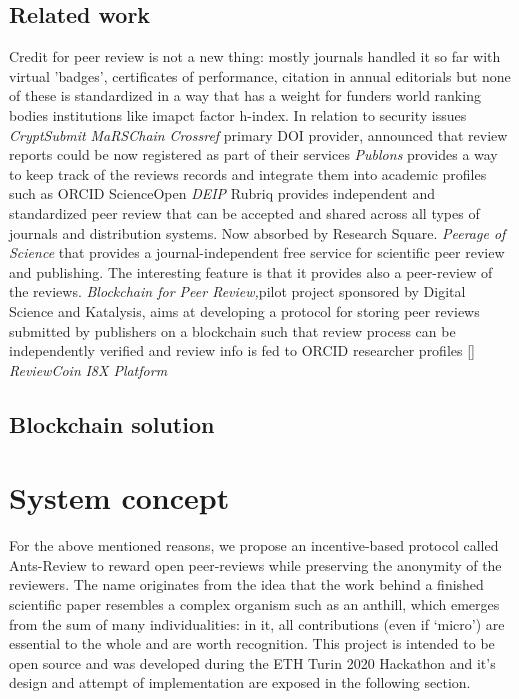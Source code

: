 \documentclass[runningheads]{llncs}
\begin{document}
\subsection{Related work}
Credit for peer review is not a new thing: mostly journals handled it so far with virtual 'badges', certificates of performance, citation in annual editorials but none of these is standardized in a way that has a weight for funders world ranking bodies institutions like imapct factor h-index.
In relation to security issues \emph{CryptSubmit} \emph{MaRSChain}
\emph{Crossref} primary DOI provider, announced that review reports could be now registered as part of their services
\emph{Publons} provides a way to keep track of the reviews records and integrate them into academic profiles such as ORCID
ScienceOpen
\emph{DEIP}
Rubriq provides independent and standardized peer review that can be accepted and shared across all types of journals and distribution systems. Now absorbed by Research Square.
\emph{Peerage of Science} that provides a journal-independent free service for scientific peer review and publishing. The interesting feature is that it provides also a peer-review of the reviews.
\emph{Blockchain for Peer Review,}pilot project sponsored by Digital Science and Katalysis, aims at developing a protocol for storing peer reviews submitted by publishers on a blockchain such that review process can be independently verified and review info is fed to ORCID researcher profiles []
\emph{ReviewCoin}
\emph{I8X Platform}


\subsection{Blockchain solution}

\section{System concept}
For the above mentioned reasons, we propose an incentive-based protocol called Ants-Review to reward open peer-reviews while preserving the anonymity of the reviewers. The name originates from the idea that the work behind a finished scientific paper resembles a complex organism such as an anthill, which emerges from the sum of many individualities: in it, all contributions (even if ‘micro’) are essential to the whole and are worth recognition.
This project is intended to be open source and was developed during the ETH Turin 2020 Hackathon and it’s design and attempt of implementation are exposed in the following section.
\end{document}
